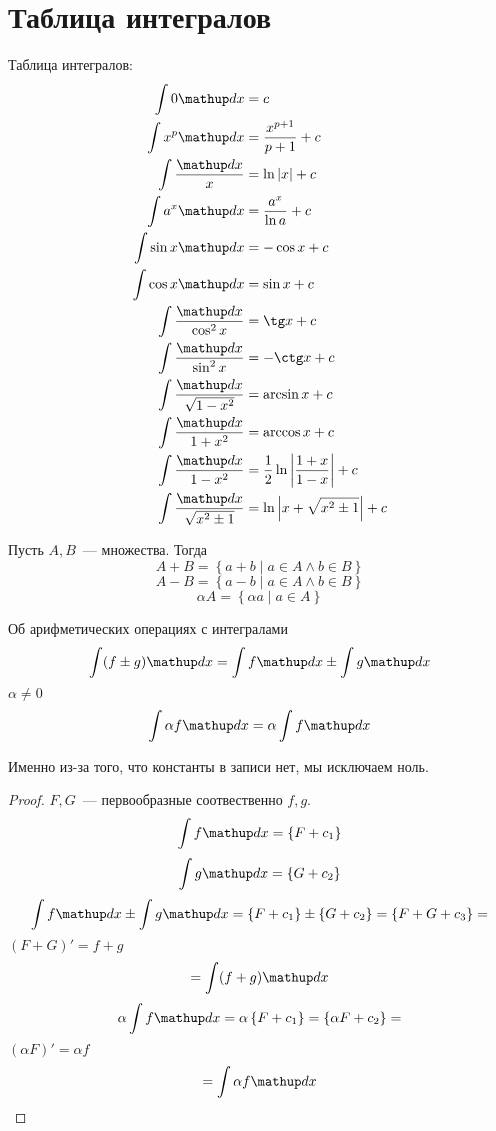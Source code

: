 ﻿\section{Таблица интегралов}

Таблица интегралов:
\begin{align*}
\int 0\d x &= c \\
\int x^p\d x &= \frac{x^{p+1}}{p + 1} + c \\
\int \frac{\d x}{x} &= \ln |x| + c \\
\int a^x \d x &= \frac{a^x}{\ln a} + c \\
\int \sin x \d x &= -\cos x + c \\
\int \cos x \d x &= \sin x + c \\
\int \frac{\d x}{\cos^2 x} &= \tg x + c \\
\int \frac{\d x}{\sin^2 x} &= -\ctg x + c \\
\int \frac{\d x}{\sqrt{1 - x^2}} &= \arcsin x + c \\
\int \frac{\d x}{1 + x^2} &= \arccos x + c \\
\int \frac{\d x}{1 - x^2} &= \frac12 \ln \left|\frac{1+x}{1-x}\right| + c\\
\int \frac{\d x}{\sqrt{x^2 \pm 1}} &= \ln \left|x + \sqrt{x^2 \pm 1}\right| + c
\end{align*}

\begin{Def}
Пусть $A, B$~--- множества. Тогда
$$A + B = \left\{a + b \mid a \in A \land b \in B\right\}$$
$$A - B = \left\{a - b \mid a \in A \land b \in B\right\}$$
$$\alpha A = \left\{\alpha a \mid a \in A\right\}$$
\end{Def}

\begin{theorem}{Об арифметических операциях с интегралами}
$$\int (f \pm g) \d x = \int f \d x \pm \int g \d x$$
$\alpha \ne 0$
$$\int \alpha f \d x = \alpha \int f \d x$$
\end{theorem}
\begin{Rem}
Именно из-за того, что константы в записи нет, мы исключаем ноль.
\end{Rem}
\begin{proof}
$F, G$~--- первообразные соотвественно $f, g$.
$$\int f \d x = \left\{F + c_1\right\}$$
$$\int g \d x = \left\{G + c_2\right\}$$
$$\int f \d x \pm \int g \d x = \left\{F + c_1\right\} \pm \left\{G + c_2\right\} = \left\{F+G+c_3\right\} = $$
$(F+G)' = f + g$
$$ = \int (f+g)\d x$$
$$\alpha \int f \d x = \alpha \left\{F + c_1\right\} = \left\{\alpha F + c_2\right\} = $$
$(\alpha F)' = \alpha f$
$$ = \int \alpha f\d x$$
\end{proof}

